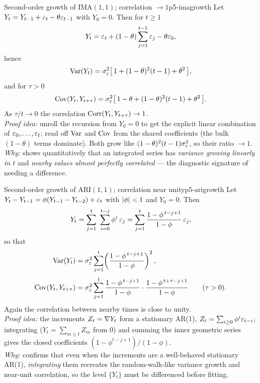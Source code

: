 \begin{theorem}{Second-order growth of IMA$(1,1)$; correlation $\to 1$}{p5-imagrowth}
Let $Y_t=Y_{t-1}+\varepsilon_t-\theta\varepsilon_{t-1}$ with $Y_0=0$. Then for $t\ge1$
\[
Y_t=\varepsilon_t+(1-\theta)\sum_{j=1}^{t-1}\varepsilon_j-\theta\varepsilon_0 ,
\]
hence
\[
\operatorname{Var}(Y_t)=\sigma_\varepsilon^2\bigl[\,1+(1-\theta)^{2}(t-1)+\theta^{2}\,\bigr],
\]
and for $\tau>0$
\[
\operatorname{Cov}(Y_t,Y_{t+\tau})=\sigma_\varepsilon^2\bigl[\,1-\theta+(1-\theta)^{2}(t-1)+\theta^{2}\,\bigr].
\]
As $\tau/t\to0$ the correlation $\operatorname{Corr}(Y_t,Y_{t+\tau})\to1$.\\[2pt]
\textit{Proof idea:} unroll the recursion from $Y_0=0$ to get the explicit
linear combination of $\varepsilon_0,\dots,\varepsilon_t$; read off $\operatorname{Var}$ and $\operatorname{Cov}$ from the
shared coefficients (the bulk $(1-\theta)$ terms dominate). Both grow like
$(1-\theta)^2(t-1)\sigma_\varepsilon^2$, so their ratio $\to1$.\\
\textit{Why:} shows quantitatively that an integrated series has
\emph{variance growing linearly in $t$} and \emph{nearby values almost perfectly
correlated} --- the diagnostic signature of needing a difference.
\end{theorem}

\begin{theorem}{Second-order growth of ARI$(1,1)$; correlation near unity}{p5-arigrowth}
Let $Y_t-Y_{t-1}=\phi(Y_{t-1}-Y_{t-2})+\varepsilon_t$ with $\left\lvert \phi \right\rvert<1$ and $Y_0=0$.
Then
\[
Y_t=\sum_{j=1}^{t}\ \sum_{i=0}^{t-j}\phi^{i}\,\eps_j
=\sum_{j=1}^{t}\frac{1-\phi^{\,t-j+1}}{1-\phi}\,\eps_j ,
\]
so that
\[
\begin{aligned}
\operatorname{Var}(Y_t)&=\sigma_\varepsilon^2\sum_{j=1}^{t}\!\left(\frac{1-\phi^{\,t-j+1}}{1-\phi}\right)^{2},\\[2pt]
\operatorname{Cov}(Y_t,Y_{t+\tau})&=\sigma_\varepsilon^2\sum_{j=1}^{t}
\frac{1-\phi^{\,t-j+1}}{1-\phi}\cdot\frac{1-\phi^{\,t+\tau-j+1}}{1-\phi}
\qquad (\tau>0).
\end{aligned}
\]
Again the correlation between nearby times is close to unity.\\[2pt]
\textit{Proof idea:} the increments $Z_t=\nabla Y_t$ form a stationary AR(1),
$Z_t=\sum_{i\ge0}\phi^{i}\varepsilon_{t-i}$; integrating ($Y_t=\sum_{m\le t}Z_m$ from
$0$) and summing the inner geometric series gives the closed coefficients
$(1-\phi^{t-j+1})/(1-\phi)$.\\
\textit{Why:} confirms that even when the increments are a well-behaved
stationary AR(1), \emph{integrating} them recreates the random-walk-like
variance growth and near-unit correlation, so the level $\{Y_t\}$ must be
differenced before fitting.
\end{theorem}

